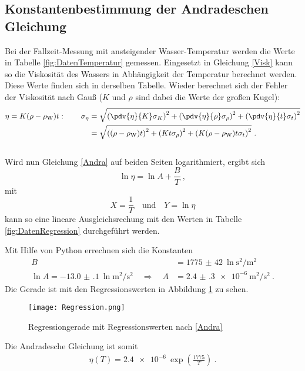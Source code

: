 \subsection{Konstantenbestimmung der Andradeschen Gleichung}
Bei der Fallzeit-Messung mit ansteigender Wasser-Temperatur werden die Werte in Tabelle \ref{fig:DatenTemperatur} gemessen. Eingesetzt in Gleichung \eqref{Visk} kann so die Viskosität des Wassers in Abhängigkeit der Temperatur berechnet werden. Diese Werte finden sich in derselben Tabelle. Wieder berechnet sich der Fehler der Viskosität nach Gauß ($K$ und $\rho$ sind dabei die Werte der großen Kugel):
\begin{align}
	\eta = K(\rho-\rho_\text{W})t: \qquad \sigma_{\eta} &= \sqrt{\left(\pdv{\eta}{K}\sigma_K\right)^2+\left(\pdv{\eta}{\rho}\sigma_{\rho}\right)^2 + \left(\pdv{\eta}{t}\sigma_{t}\right)^2} \\
	&= \sqrt{\left((\rho-\rho_\text{W})t\right)^2+\left(Kt\sigma_\rho\right)^2+\left(K(\rho-\rho_\text{W})t\sigma_t\right)^2} \ .
\end{align}
 \\
Wird nun Gleichung \eqref{Andra} auf beiden Seiten logarithmiert, ergibt sich
\[ \ln\eta = \ln A + \frac{B}{T} \ , \]
mit
\[ X = \frac{1}{T} \quad \text{und} \quad Y = \ln\eta \]
kann so eine lineare Ausgleichsrechung mit den Werten in Tabelle \ref{fig:DatenRegression} durchgeführt werden.

Mit Hilfe von Python errechnen sich die Konstanten
\begin{align}
	B &= \SI{1775(42)}{\ln\second\squared\per\metre\squared} \\
	\ln A = \SI{-13.0(1)}{\ln\metre\squared\per\second\squared} \quad \Rightarrow \quad A &= \SI{2.4(3)e-6}{\metre\squared\per\second\squared} \ .
\end{align}
Die Gerade ist mit den Regressionswerten in Abbildung \ref{fig:Regression} zu sehen.
\begin{figure}[h!]
	\centering
	\texttt{[image: Regression.png]}
	\caption{Regressiongerade mit Regressionswerten nach \eqref{Andra}}
	\label{fig:Regression}
\end{figure}
Die Andradesche Gleichung ist somit
\begin{align}
	\eta(T) = \SI{2.4e-6}{}\exp\left(\frac{1775}{T}\right) \ .
\end{align}
\clearpage


